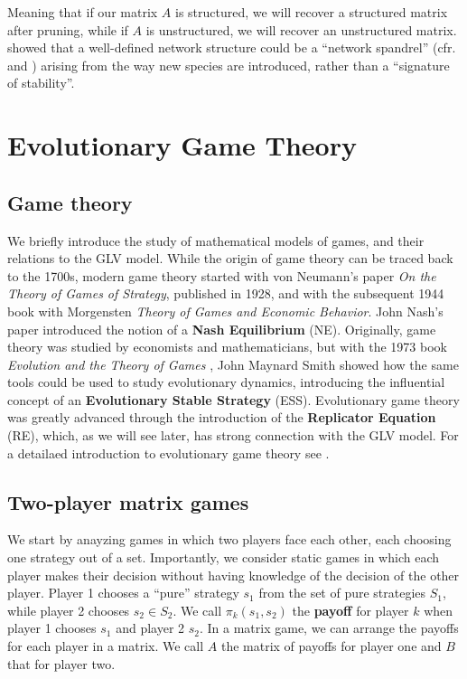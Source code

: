 \documentclass[
]{book}
\begin{document}
Meaning that if our matrix \(A\) is structured, we will recover a structured matrix after pruning, while if \(A\) is unstructured, we will recover an unstructured matrix. \citet{maynard2018network} showed that a well-defined network structure could be a ``network spandrel'' (cfr. \citet{gould1979spandrels} and \citet{sole2006network}) arising from the way new species are introduced, rather than a ``signature of stability''.

\hypertarget{games}{%
\chapter{Evolutionary Game Theory}\label{games}}

\hypertarget{game-theory}{%
\section{Game theory}\label{game-theory}}

We briefly introduce the study of mathematical models of games, and their relations to the GLV model. While the origin of game theory can be traced back to the 1700s, modern game theory started with von Neumann's paper \emph{On the Theory of Games of Strategy}, published in 1928, and with the subsequent 1944 book with Morgensten \emph{Theory of Games and Economic Behavior}. John Nash's paper \citep{nash1950equilibrium} introduced the notion of a \textbf{Nash Equilibrium} (NE). Originally, game theory was studied by economists and mathematicians, but with the 1973 book \emph{Evolution and the Theory of Games} \citep{smith1982evolution}, John Maynard Smith showed how the same tools could be used to study evolutionary dynamics, introducing the influential concept of an \textbf{Evolutionary Stable Strategy} (ESS). Evolutionary game theory was greatly advanced through the introduction of the \textbf{Replicator Equation} (RE), which, as we will see later, has strong connection with the GLV model. For a detailaed introduction to evolutionary game theory see \citet{hofbauer1998evolutionary}.

\hypertarget{two-player-matrix-games}{%
\section{Two-player matrix games}\label{two-player-matrix-games}}

We start by anayzing games in which two players face each other, each choosing one strategy out of a set. Importantly, we consider static games in which each player makes their decision without having knowledge of the decision of the other player. Player 1 chooses a ``pure'' strategy \(s_1\) from the set of pure strategies \(S_1\), while player 2 chooses \(s_2 \in S_2\). We call \(\pi_k (s_1, s_2)\) the \textbf{payoff} for player \(k\) when player 1 chooses \(s_1\) and player 2 \(s_2\). In a matrix game, we can arrange the payoffs for each player in a matrix. We call \(A\) the matrix of payoffs for player one and \(B\) that for player two.
\end{document}
